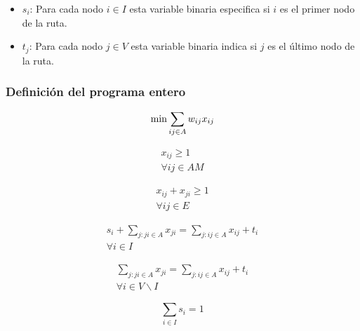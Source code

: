 \documentclass[spanish, conference]{IEEEtran}
\begin{document}
{\begin{itemize}
\item $s_i$: Para cada nodo $i \in I$ esta variable binaria especifica si  $i$ es el primer nodo de la ruta.

\item $t_j$: Para cada nodo $j \in V$ esta variable binaria indica si $j$ es el último nodo de la ruta.
\end{itemize}

\subsubsection{Definición del programa entero}
\begin{equation*}
\min \sum_{i j \in A} w_{i j} x_{i j}  \\
\end{equation*} 
\hbox{}

\begin{equation} \tag{1} \label{eq1}
\begin{gathered}
x_{i j} \geq 1 \\
\forall i j \in A M
\end{gathered}
\end{equation} 
\hbox{}

\begin{equation} \tag{2} \label{eq2}
\begin{gathered}
x_{i j} + x_{j i} \geq 1 \\
\forall i j \in E
\end{gathered}
\end{equation}
\hbox{}

\begin{equation} \tag{3a} \label{eq3a}
\begin{gathered}
s_i + \sum_{j: j i \in A} x_{j i} = \sum_{j: i j \in A} x_{i j} + t_i \\
\forall i \in I
\end{gathered}
\end{equation} 
\hbox{}

\begin{equation} \tag{3b} \label{eq3b}
\begin{gathered}
\sum_{j: j i \in A} x_{j i} = \sum_{j: i j \in A} x_{i j} + t_i \\
\forall i \in V\backslash I
\end{gathered}
\end{equation}
\hbox{}

\begin{equation} \tag{4} \label{eq4}
\sum_{i \in I} s_i = 1 
\end{equation}
\hbox{}

}
\end{document}
